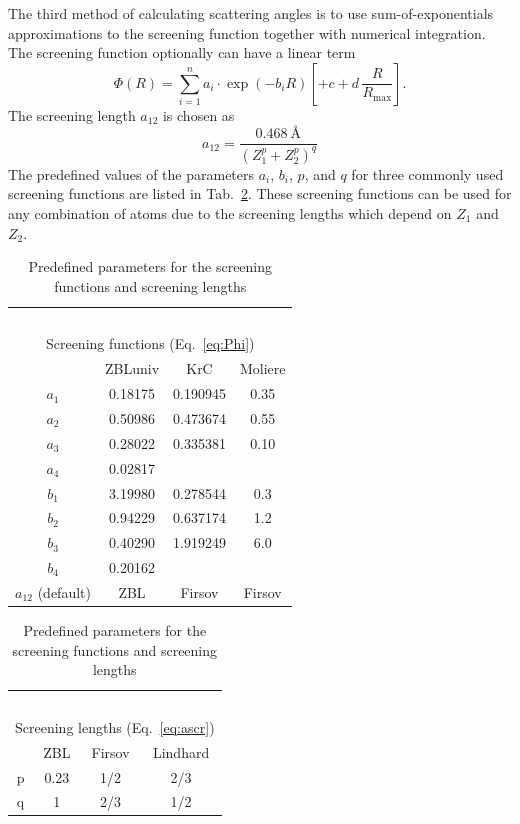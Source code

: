 The third method of calculating scattering angles is to use 
sum-of-exponentials approximations to the screening function together with
numerical integration. The screening function optionally can have a 
linear term
%
\begin{equation}
   \Phi(R) = \sum_{i=1}^n a_i \cdot \exp(-b_i R) 
             \left[ + c + d \, \frac{R}{R_\mathrm{max}} \right] .
    \label{eq:Phi}
\end{equation}
%
The screening length $a_{12}$ is chosen as
%
\begin{equation}
   a_{12} = \frac{0.468~\mbox{\AA}}{\left(Z_1^p + Z_2^p\right)^q}
   \label{eq:ascr}
\end{equation}
%
The predefined values of the parameters $a_i$, $b_i$, $p$, and $q$ for
three commonly used screening functions are listed in Tab.~\ref{tab:screen}. 
These screening functions can be used for any combination of atoms due to
the screening lengths which depend on $Z_1$ and $Z_2$.
%
\begin{table}
    \caption{Predefined parameters for the screening functions and screening 
             lengths \label{tab:screen}}
    \begin{center}
    \begin{tabular}{cccc}
        ~\\
        \multicolumn{4}{c}{Screening functions (Eq.~\ref{eq:Phi})} \\
        \hline
        & ZBLuniv \cite{I8512} & KrC \cite{I7702} & Moliere \cite{I4701} \\
        \hline
        $a_1$ & 0.18175 & 0.190945 & 0.35 \\
        $a_2$ & 0.50986 & 0.473674 & 0.55 \\
        $a_3$ & 0.28022 & 0.335381 & 0.10 \\
        $a_4$ & 0.02817 &  &  \\
        $b_1$ & 3.19980 & 0.278544 & 0.3 \\
        $b_2$ & 0.94229 & 0.637174 & 1.2 \\
        $b_3$ & 0.40290 & 1.919249 & 6.0 \\
        $b_4$ & 0.20162 &  &  \\
        $a_{12}$ (default) & ZBL & Firsov & Firsov \\
        \hline
    \end{tabular}
    \hfill
    \begin{tabular}{cccc}
        ~\\
        \multicolumn{4}{c}{Screening lengths (Eq.~\ref{eq:ascr})}\\
        \hline
        & ZBL \cite{I8512} & Firsov \cite{I5801} & Lindhard \cite{I6301} \\
        \hline
        p & 0.23 & 1/2 & 2/3 \\
        q & 1    & 2/3 & 1/2 \\
        \hline
    \end{tabular}
    \end{center}
\end{table}


